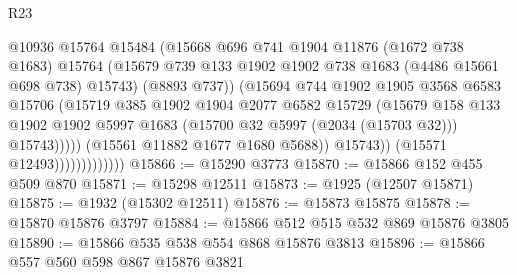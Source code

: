 \begin{lexlean}{R23}
\begin{coremodule}
                                      @10936
                                      @15764
                                      @15484
                                      (@15668
                                        @696
                                        @741
                                        @1904
                                        @11876
                                        (@1672 @738 @1683)
                                        @15764
                                        (@15679
                                          @739
                                          @133
                                          @1902
                                          @1902
                                          @738
                                          @1683
                                          (@4486 @15661 @698 @738)
                                          @15743)
                                        (@8893 @737))
                                      (@15694
                                        @744
                                        @1902
                                        @1905
                                        @3568
                                        @6583
                                        @15706
                                        (@15719
                                          @385
                                          @1902
                                          @1904
                                          @2077
                                          @6582
                                          @15729
                                          (@15679
                                            @158
                                            @133
                                            @1902
                                            @1902
                                            @5997
                                            @1683
                                            (@15700 @32 @5997 (@2034 (@15703 @32)))
                                            @15743)))))
                                  (@15561 @11882 @1677 @1680 @5688))
                                @15743))
                            (@15571 @12493)))))))))))))
@15866 := @15290 @3773
@15870 := @15866 @152 @455 @509 @870
@15871 := @15298 @12511
@15873 := @1925 (@12507 @15871)
@15875 := @1932 (@15302 @12511)
@15876 := @15873 @15875
@15878 := @15870 @15876 @3797
@15884 := @15866 @512 @515 @532 @869 @15876 @3805
@15890 := @15866 @535 @538 @554 @868 @15876 @3813
@15896 := @15866 @557 @560 @598 @867 @15876 @3821

\end{coremodule}
\end{lexlean}
